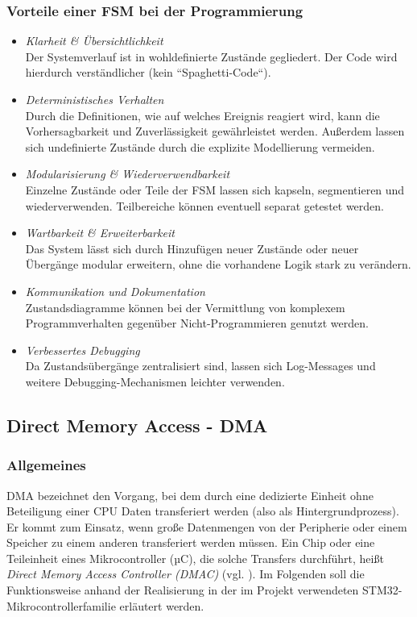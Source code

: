 \documentclass[a4paper, portrait, 12pt]{scrartcl} %
\begin{document}
\subsubsection{Vorteile einer FSM bei der Programmierung}
\begin{itemize}
	\item \emph{Klarheit \& Übersichtlichkeit}\\
	Der Systemverlauf ist in wohldefinierte Zustände gegliedert. Der Code wird hierdurch verständlicher (kein ``Spaghetti-Code``).
	\item \emph{Deterministisches Verhalten}\\
	Durch die Definitionen, wie auf welches Ereignis reagiert wird, kann die Vorhersagbarkeit und Zuverlässigkeit gewährleistet werden. Außerdem lassen sich undefinierte Zustände durch die explizite Modellierung vermeiden.
	\item \emph{Modularisierung \& Wiederverwendbarkeit}\\
	Einzelne Zustände oder Teile der FSM lassen sich kapseln, segmentieren und wiederverwenden. Teilbereiche können eventuell separat getestet werden.
	\item \emph{Wartbarkeit \& Erweiterbarkeit}\\
	Das System lässt sich durch Hinzufügen neuer Zustände oder neuer Übergänge modular erweitern, ohne die vorhandene Logik stark zu verändern.
	\item \emph{Kommunikation und Dokumentation}\\
	Zustandsdiagramme können bei der Vermittlung von komplexem Programmverhalten gegenüber Nicht-Programmieren genutzt werden.
	\item \emph{Verbessertes Debugging}\\
	Da Zustandsübergänge zentralisiert sind, lassen sich Log-Messages und weitere Debugging-Mechanismen leichter verwenden.
\end{itemize}

\subsection{Direct Memory Access - DMA}
\subsubsection{Allgemeines}
DMA bezeichnet den Vorgang, bei dem durch eine dedizierte Einheit ohne Beteiligung einer CPU Daten transferiert werden (also als Hintergrundprozess). Er kommt zum Einsatz, wenn große Datenmengen von der Peripherie oder einem Speicher zu einem anderen transferiert werden müssen. Ein Chip oder eine Teileinheit eines Mikrocontroller (µC), die solche Transfers durchführt, heißt \emph{Direct Memory Access Controller (DMAC)} (vgl. \cite[S. 125]{Urbanek2020}). Im Folgenden soll die Funktionsweise anhand der Realisierung in der im Projekt verwendeten STM32-Mikrocontrollerfamilie erläutert werden.
\end{document}
